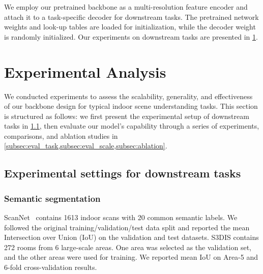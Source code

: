 \documentclass[10pt,twocolumn,letterpaper]{article}
\begin{document}
 \begin{table}[t]
    \centering
    \vspace{2pt}
    \caption{Model parameters, inference latency, and memory footprint, evaluated on Structured3D segmentation.}
    \label{tab:perf-nets}  \vspace{-2mm}
\end{table}
 We employ our pretrained backbone as a multi-resolution feature encoder and attach it to a task-specific decoder for downstream tasks. The pretrained network weights and look-up tables are loaded for initialization, while the decoder weight is randomly initialized. Our experiments on downstream tasks are presented in \cref{sec:results}.


\section{Experimental Analysis} \label{sec:results}

We conducted experiments to assess the scalability, generality, and effectiveness of our backbone design for typical indoor scene understanding tasks. This section is structured as follows: we first present the experimental setup of downstream tasks in \cref{subsec:setting}, then evaluate our model's capability through a series of experiments, comparisons, and ablation studies in \cref{subsec:eval_task,subsec:eval_scale,subsec:ablation}.

\subsection{Experimental settings for downstream tasks} \label{subsec:setting}

\subsubsection{Semantic segmentation}
 ScanNet~\cite{dai2017scannet} contains 1613 indoor scans with 20 common semantic labels. We followed the original training/validation/test data split and reported the mean Intersection over Union (IoU) on the validation and test datasets. S3DIS contains 272 rooms from 6 large-scale areas. One area was selected as the validation set, and the other areas were used for training. We reported mean IoU on Area-5 and 6-fold cross-validation results.
\end{document}
